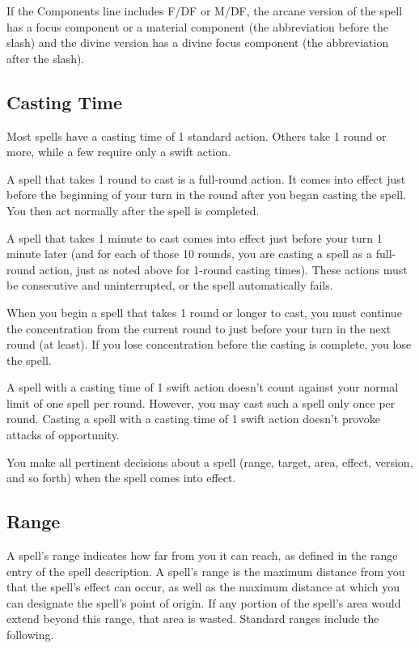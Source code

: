 If the Components line includes F/DF or M/DF, the arcane version of the spell has a focus component or a material component (the abbreviation before the slash) and the divine version has a divine focus component (the abbreviation after the slash).
				
\subsection{Casting Time}

				
Most spells have a casting time of 1 standard action. Others take 1 round or more, while a few require only a swift action.
				
A spell that takes 1 round to cast is a full-round action. It comes into effect just before the beginning of your turn in the round after you began casting the spell. You then act normally after the spell is completed.
				
A spell that takes 1 minute to cast comes into effect just before your turn 1 minute later (and for each of those 10 rounds, you are casting a spell as a full-round action, just as noted above for 1-round casting times). These actions must be consecutive and uninterrupted, or the spell automatically fails.
				
When you begin a spell that takes 1 round or longer to cast, you must continue the concentration from the current round to just before your turn in the next round (at least). If you lose concentration before the casting is complete, you lose the spell.
				
A spell with a casting time of 1 swift action doesn't count against your normal limit of one spell per round. However, you may cast such a spell only once per round. Casting a spell with a casting time of 1 swift action doesn't provoke attacks of opportunity.
				
You make all pertinent decisions about a spell (range, target, area, effect, version, and so forth) when the spell comes into effect.
				
\subsection{Range}

				
A spell's range indicates how far from you it can reach, as defined in the range entry of the spell description. A spell's range is the maximum distance from you that the spell's effect can occur, as well as the maximum distance at which you can designate the spell's point of origin. If any portion of the spell's area would extend beyond this range, that area is wasted. Standard ranges include the following.
				

